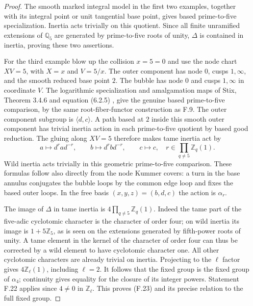 \begin{proof}
The smooth marked integral model in the first two examples,
together with its integral point or unit tangential base point,
gives based prime-to-five specialization.  Inertia acts trivially
on this quotient.  Since all finite unramified extensions of
$\mathbb Q_5$ are generated by prime-to-five roots of unity,
$\Delta$ is contained in inertia, proving these two assertions.

For the third example blow up the collision $x=5=0$ and use the
node chart $XV=5$, with $X=x$ and $V=5/x$.
The outer component has node $0$, cusps $1,\infty$, and the
smooth reduced base point $2$.  The bubble has node $0$ and
cusps $1,\infty$ in coordinate $V$.
The logarithmic specialization and amalgamation maps of
Stix, Theorem 3.4.6 and equation (6.2.5)
\cite{BC_Stix2002}, give the genuine based prime-to-five
comparison, by the same root-fiber-functor construction as F.9.
The outer component subgroup is $\langle d,c\rangle$.
A path based at $2$ inside this smooth outer component has
trivial inertia action in each prime-to-five quotient by based
good reduction.  The gluing along $XV=5$ therefore makes tame
inertia act by
\[
 a\longmapsto d^r a d^{-r},\qquad
 b\longmapsto d^r b d^{-r},\qquad c\longmapsto c,
 \quad r\in\prod_{q\ne5}\mathbb Z_q(1).
\]
Wild inertia acts trivially in this geometric prime-to-five
comparison.  These formulas follow also directly from the node
Kummer covers: a turn in the base annulus conjugates the bubble
loops by the common edge loop and fixes the based outer loops.
In the free basis $(x,y,z)=(b,d,c)$ the action is $\alpha_r$.

The image of $\Delta$ in tame inertia is
$4\prod_{q\ne5}\mathbb Z_q(1)$.  Indeed the tame part of the
five-adic cyclotomic character is the character of order four;
on wild inertia its image is $1+5\mathbb Z_5$, as is seen on
the extensions generated by fifth-power roots of unity.
A tame element in the kernel of the character of order four
can thus be corrected by a wild element to have cyclotomic
character one.  All other cyclotomic characters are already
trivial on inertia.  Projecting to the $\ell$ factor gives
$4\mathbb Z_\ell(1)$, including $\ell=2$.
It follows that the fixed group is the fixed group of
$\alpha_4$; continuity gives equality for the closure of its
integer powers.  Statement F.22 applies since $4\ne0$ in
$\mathbb Z_\ell$.  This proves (F.23) and its precise relation
to the full fixed group.
\end{proof}

